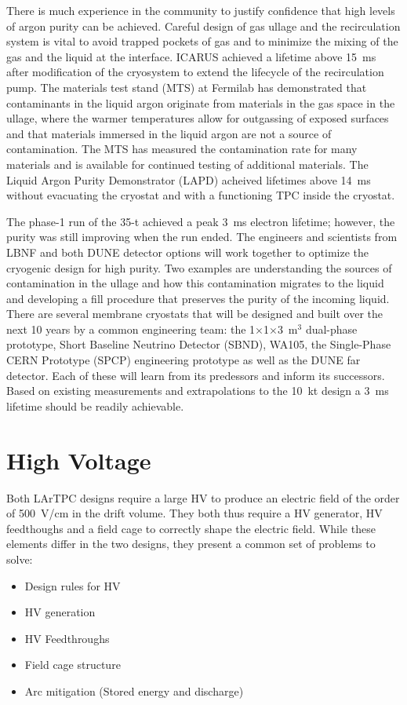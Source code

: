 There is much experience in the community to justify confidence that
high levels of argon purity can be achieved.  Careful design of gas
ullage and the recirculation system is vital to avoid trapped pockets
of gas and to minimize the mixing of the gas and the liquid at the
interface.  ICARUS achieved a lifetime above 15~ms after modification of
the cryosystem to extend the lifecycle of the recirculation
pump.\cite{Antonello:2014eha} The materials test stand (MTS) at Fermilab has
demonstrated that contaminants in the liquid argon originate from
materials in the gas space in the ullage, where the warmer
temperatures allow for outgassing of exposed surfaces and that
materials immersed in the liquid argon are not a source of
contamination.\cite{andrewsNIM} The MTS has measured the
contamination rate for many materials and is available for
continued testing of additional materials.  The Liquid Argon Purity
Demonstrator (LAPD) acheived lifetimes above 14~ms without evacuating
the cryostat and with a functioning TPC inside the
cryostat.\cite{Bromberg:2015uia}

The phase-1 run of the 35-t achieved a peak 3~ms electron lifetime;
however, the purity was still improving when the run ended.  The
engineers and scientists from LBNF and both DUNE detector options will
work together to optimize the cryogenic design for high purity. Two
examples are understanding the sources of contamination in the ullage
and how this contamination migrates to the liquid and developing a
fill procedure that preserves the purity of the incoming liquid.
There are several membrane cryostats that will be designed and built
over the next 10 years by a common engineering team: the
1$\times$1$\times$3~m$^3$ dual-phase prototype, Short Baseline
Neutrino Detector (SBND), WA105, the Single-Phase CERN Prototype
(SPCP) engineering prototype as well as the DUNE far detector. Each of
these will learn from its predessors and inform its successors. Based
on existing measurements and extrapolations to the 10~kt design a 3~ms
lifetime should be readily achievable.


\section{High Voltage}

Both LArTPC designs require a large HV to
produce an electric field of the order of 500~V/cm in the drift
volume.  They both thus require a HV generator, HV
feedthoughs and a field cage to correctly shape the electric
field. While these elements differ in the two designs, they present a common
set of problems to solve:
\begin{itemize}
\item Design rules for HV
\item HV generation
\item HV Feedthroughs
\item Field cage structure
\item Arc mitigation (Stored energy and discharge)
\end{itemize}


